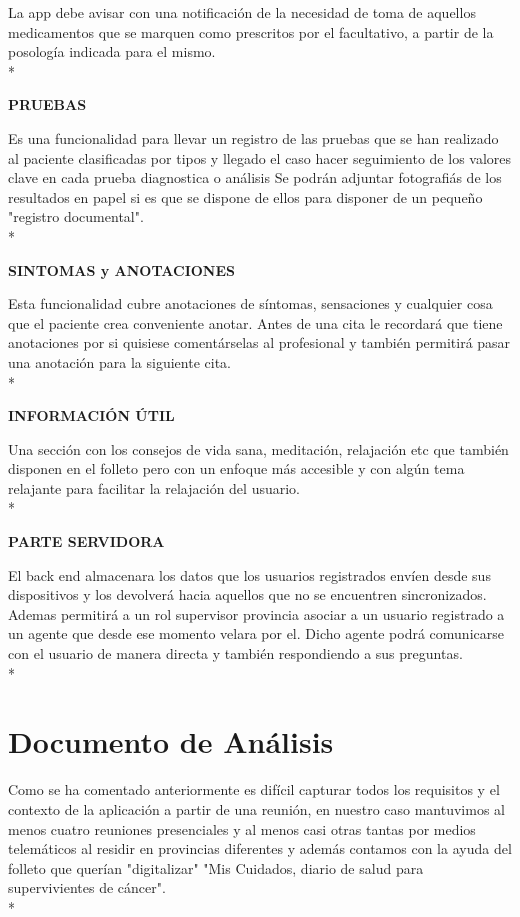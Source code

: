 \documentclass[../pfc.tex]{subfiles}
\begin{document}
	La app debe avisar con una notificación de la necesidad de toma de aquellos medicamentos que se marquen como prescritos por el facultativo, a partir de la posología indicada para el mismo. \\*

	\textbf{PRUEBAS}
	
	Es una funcionalidad para llevar un registro de las pruebas que se han realizado al paciente clasificadas por tipos y llegado el caso hacer seguimiento de los valores clave en cada prueba diagnostica o análisis Se podrán adjuntar fotografiás de los resultados en papel si es que se dispone de ellos para disponer de un pequeño "registro documental".\\*
	
	\textbf{SINTOMAS y ANOTACIONES}
	
	Esta funcionalidad cubre anotaciones de síntomas, sensaciones y cualquier cosa que el paciente crea conveniente anotar. Antes de una cita le recordará que tiene anotaciones por si quisiese comentárselas al profesional y también permitirá pasar una anotación para la siguiente cita.\\*

	\textbf{INFORMACIÓN ÚTIL}
	
	Una sección con los consejos de vida sana, meditación, relajación etc que también disponen en el folleto pero con un enfoque más accesible y con algún tema relajante para facilitar la relajación del usuario.\\* 
	
	\textbf{PARTE SERVIDORA}

	El back end almacenara los datos que los usuarios registrados envíen desde sus dispositivos y los devolverá hacia aquellos que no se encuentren sincronizados. Ademas permitirá a un rol supervisor provincia asociar a un usuario registrado a un agente que desde ese momento velara por el. Dicho agente podrá comunicarse con el usuario de manera directa y también respondiendo a sus preguntas.\\*  

	\clearpage
	
	\section{Documento de Análisis}

	Como se ha comentado anteriormente es difícil capturar todos los requisitos y el contexto de la aplicación a partir de una reunión, en nuestro caso mantuvimos al menos cuatro reuniones presenciales y al menos casi otras tantas por medios telemáticos al residir en provincias diferentes y además contamos con la ayuda del folleto que querían "digitalizar" "Mis Cuidados, diario de salud para supervivientes de cáncer".\\*
			
\end{document}
